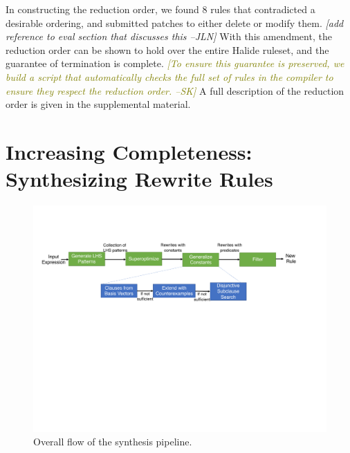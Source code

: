 \documentclass[acmsmall,review,anonymous]{acmart}\settopmatter{printfolios=true,printccs=false,printacmref=false}
\newcommand{\jln}[1]{\textcolor{uwpurple}{\textit{[{#1} --JLN]}}}
\newcommand{\sak}[1]{\textcolor{olive}{\textit{[{#1} --SK]}}}
\begin{document}
In constructing the reduction order, we found 8 rules that contradicted a desirable ordering, and submitted patches to either delete or modify them. \jln{add reference to eval section that discusses this} With this amendment, the reduction order can be shown to hold over the entire Halide ruleset, and the guarantee of termination is complete. \sak{To ensure this guarantee is preserved, we build a script that automatically checks the full set of rules in the compiler to ensure they respect the reduction order.} A full description of the reduction order is given in the supplemental material.

\section{Increasing Completeness: Synthesizing Rewrite Rules}
\begin{figure}
\includegraphics[width=1.\columnwidth]{figures/synthesis-flow.pdf}
\caption{Overall flow of the synthesis pipeline.}
\label{fig:synthesis-flow}
\end{figure}
\end{document}
